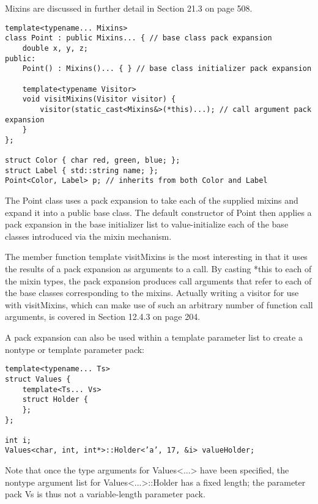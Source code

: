 \begin{tcolorbox}[colback=webgreen!5!white,colframe=webgreen!75!black]
\hspace*{0.75cm}Mixins are discussed in further detail in Section 21.3 on page 508.
\end{tcolorbox}

\begin{lstlisting}[style=styleCXX]
template<typename... Mixins>
class Point : public Mixins... { // base class pack expansion
	double x, y, z;
public:
	Point() : Mixins()... { } // base class initializer pack expansion
	
	template<typename Visitor>
	void visitMixins(Visitor visitor) {
		visitor(static_cast<Mixins&>(*this)...); // call argument pack expansion
	}
};

struct Color { char red, green, blue; };
struct Label { std::string name; };
Point<Color, Label> p; // inherits from both Color and Label
\end{lstlisting}

The Point class uses a pack expansion to take each of the supplied mixins and expand it into a public base class. The default constructor of Point then applies a pack expansion in the base initializer list to value-initialize each of the base classes introduced via the mixin mechanism.

The member function template visitMixins is the most interesting in that it uses the results of a pack expansion as arguments to a call. By casting *this to each of the mixin types, the pack expansion produces call arguments that refer to each of the base classes corresponding to the mixins. Actually writing a visitor for use with visitMixins, which can make use of such an arbitrary number of function call arguments, is covered in Section 12.4.3 on page 204.

A pack expansion can also be used within a template parameter list to create a nontype or template parameter pack:

\begin{lstlisting}[style=styleCXX]
template<typename... Ts>
struct Values {
	template<Ts... Vs>
	struct Holder {
	};
};

int i;
Values<char, int, int*>::Holder<’a’, 17, &i> valueHolder;
\end{lstlisting}

Note that once the type arguments for Values<...> have been specified, the nontype argument list for Values<...>::Holder has a fixed length; the parameter pack Vs is thus not a variable-length parameter pack.

